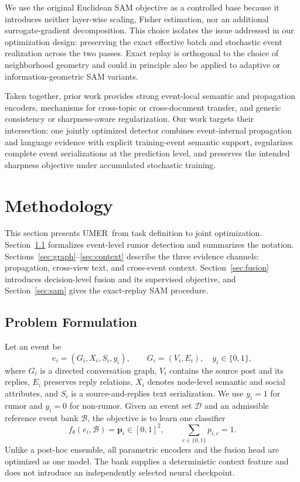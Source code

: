 \documentclass[sigconf,anonymous,review]{../acmart/acmart}
\newcommand{\method}{\textsc{UMER}}
\begin{document}
We use the original Euclidean SAM objective as a controlled base because it
introduces neither layer-wise scaling, Fisher estimation, nor an additional
surrogate-gradient decomposition. This choice isolates the issue addressed in
our optimization design: preserving the exact effective batch and stochastic
event realization across the two passes. Exact replay is orthogonal to the
choice of neighborhood geometry and could in principle also be applied to
adaptive or information-geometric SAM variants.

Taken together, prior work provides strong event-local semantic and
propagation encoders, mechanisms for cross-topic or cross-document transfer,
and generic consistency or sharpness-aware regularization. Our work targets
their intersection: one jointly optimized detector combines event-internal
propagation and language evidence with explicit training-event semantic
support, regularizes complete event serializations at the prediction level,
and preserves the intended sharpness objective under accumulated stochastic
training.

\section{Methodology}
\label{sec:method}

This section presents \method\ from task definition to joint optimization.
Section~\ref{sec:problem} formalizes event-level rumor detection and summarizes
the notation.  Sections~\ref{sec:graph}--\ref{sec:context} describe the three
evidence channels: propagation, cross-view text, and cross-event context.
Section~\ref{sec:fusion} introduces decision-level fusion and its supervised
objective, and Section~\ref{sec:sam} gives the exact-replay SAM procedure.

\subsection{Problem Formulation}
\label{sec:problem}

Let an event be
\begin{equation}
  e_i=(G_i,X_i,S_i,y_i),
  \qquad G_i=(V_i,E_i), \quad y_i\in\{0,1\},
  \label{eq:event}
\end{equation}
where $G_i$ is a directed conversation graph, $V_i$ contains the source post
and its replies, $E_i$ preserves reply relations, $X_i$ denotes node-level
semantic and social attributes, and $S_i$ is a source-and-replies text
serialization.  We use $y_i=1$ for rumor and $y_i=0$ for non-rumor.  Given an
event set $\mathcal{D}$ and an admissible reference event bank $\mathcal{B}$,
the objective is to learn one classifier
\begin{equation}
  f_{\theta}(e_i,\mathcal{B})
  =\boldsymbol{p}_i\in[0,1]^2,\qquad
  \sum_{c\in\{0,1\}}p_{i,c}=1.
  \label{eq:classifier}
\end{equation}
Unlike a post-hoc ensemble, all parametric encoders and the fusion head are
optimized as one model.  The bank supplies a deterministic context feature
and does not introduce an independently selected neural checkpoint.
\end{document}
